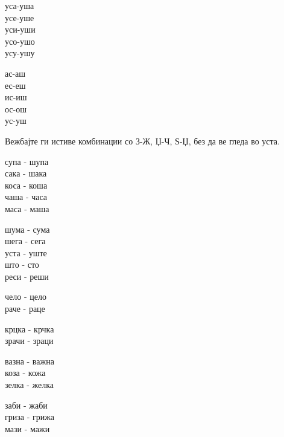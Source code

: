\documentclass[a5paper,12pt]{article}
\newenvironment{instruction}{%
  \begin{tcolorbox}[colback=white,colframe=accentcolor,title={\textbf{Инструкции}},fonttitle=\bfseries] 
}{%
  \end{tcolorbox}
}
\begin{document}
\vspace{1cm}

\noindent
\begin{minipage}[t]{0.45\textwidth}
уса-уша\\ усе-уше\\ уси-уши\\ усо-ушо\\ усу-ушу
\end{minipage}
\hfill
\begin{minipage}[t]{0.45\textwidth}
ас-аш\\ ес-еш\\ ис-иш\\ ос-ош\\ ус-уш
\end{minipage}

\begin{instruction}
Вежбајте ги истиве комбинации со З-Ж, Џ-Ч, Ѕ-Џ, без да ве гледа во уста.
\end{instruction}

\noindent
\begin{minipage}[t]{0.45\textwidth}
супа - шупа\\ сака - шака\\ коса - коша\\ чаша - часа\\ маса - маша
\end{minipage}
\hfill
\begin{minipage}[t]{0.45\textwidth}
шума - сума\\ шега - сега\\ уста - уште\\ што - сто\\ реси - реши
\end{minipage}

\vspace{1cm}

\noindent
\begin{minipage}[t]{0.45\textwidth}
чело - цело\\ раче - раце
\end{minipage}
\hfill
\begin{minipage}[t]{0.45\textwidth}
крцка - крчка\\ зрачи - зраци
\end{minipage}

\vspace{1cm}

\noindent
\begin{minipage}[t]{0.45\textwidth}
вазна - важна\\ коза - кожа\\ зелка - желка
\end{minipage}
\hfill
\begin{minipage}[t]{0.45\textwidth}
заби - жаби\\ гриза - грижа\\ мази - мажи
\end{minipage}
\end{document}
